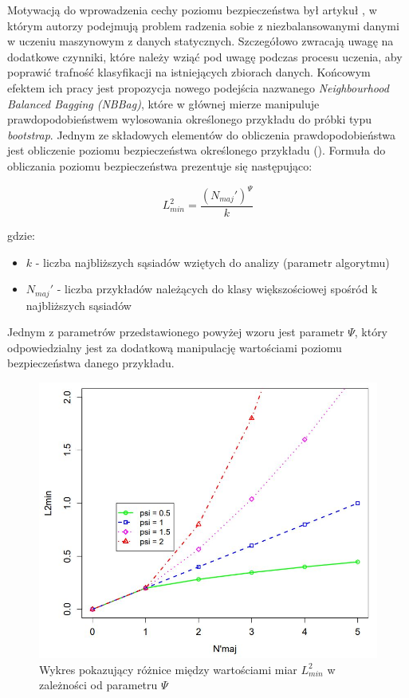 Motywacją do wprowadzenia cechy poziomu bezpieczeństwa był artykuł \cite{Article:NNBag}, w którym autorzy podejmują problem radzenia sobie z niezbalansowanymi danymi w uczeniu maszynowym z danych statycznych. Szczegółowo zwracają uwagę na dodatkowe czynniki, które należy wziąć pod uwagę podczas procesu uczenia, aby poprawić trafność klasyfikacji na istniejących zbiorach danych. Końcowym efektem ich pracy jest propozycja nowego podejścia nazwanego \textit{Neighbourhood Balanced Bagging (NBBag)}, które w głównej mierze manipuluje prawdopodobieństwem wylosowania określonego przykładu do próbki typu \textit{bootstrap}. Jednym ze składowych elementów do obliczenia prawdopodobieństwa jest obliczenie poziomu bezpieczeństwa określonego przykładu (). Formuła do obliczania poziomu bezpieczeństwa prezentuje się następująco:

\begin{equation}
    L^2_{min} = \frac{(N_{maj}')^\Psi}{k}
\end{equation}

\noindent gdzie:

\begin{itemize}
    \item $k$ - liczba najbliższych sąsiadów wziętych do analizy (parametr algorytmu)
    \item $N_{maj}'$ - liczba przykładów należących do klasy większościowej spośród k najbliższych sąsiadów
\end{itemize}

\noindent Jednym z parametrów przedstawionego powyżej wzoru jest parametr $\Psi$, który odpowiedzialny jest za dodatkową manipulację wartościami poziomu bezpieczeństwa danego przykładu.

\begin{figure}[h]
    \centering
    \includegraphics[width=13cm]{figures/psi_coeff.JPG}
    \caption{Wykres pokazujący różnice między wartościami miar $L^2_{min}$ w zależności od parametru $\Psi$ \cite{Article:NNBag}}\label{Figure:PsiCoefficient}
\end{figure}

